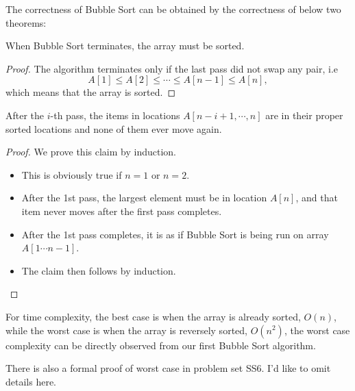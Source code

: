 \begin{spacing}{1.3}
    The correctness of Bubble Sort can be obtained by the correctness of below two theorems:
    \begin{theorem}
        When Bubble Sort terminates, the array must be sorted.
    \end{theorem}
    \begin{proof}
        The algorithm terminates only if the last pass did not swap any pair, i.e
        $$A[1] \le  A[2] \le  \cdots \le A[n - 1] \le A[n],$$
        which means that the array is sorted.
    \end{proof}
    \begin{theorem}
        After the $i$-th pass, the items in locations $A[n - i + 1, \cdots , n]$ are in their proper
        sorted locations and none of them ever move again.
    \end{theorem}
    \begin{proof}
        We prove this claim by induction.
        \begin{itemize}
            \item This is obviously true if $n=1$ or $n=2$.
            \item After the 1st pass, the largest element must be in location $A[n]$, 
            and that item never moves after the first pass completes.
            \item After the 1st pass completes, it is as if Bubble Sort is being run on array $A[1 \cdots n-1]$.
            \item The claim then follows by induction.
        \end{itemize}
    \end{proof}


    For time complexity, the best case is when the array is already sorted, $O(n)$, while 
    the worst case is when the array is reversely sorted, $O(n^2)$, the worst case complexity
    can be directly observed from our first Bubble Sort algorithm.

    There is also a formal proof of worst case in problem set SS6. I'd like to omit details here.


    
\end{spacing}
